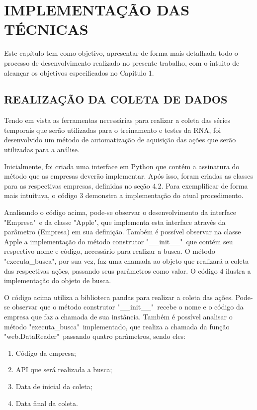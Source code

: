 
\chapter{IMPLEMENTAÇÃO DAS TÉCNICAS}\label{ch:implementacao}
Este capítulo tem como objetivo, apresentar de forma mais detalhada todo o processo de desenvolvimento realizado no presente trabalho, com o intuito de alcançar os objetivos especificados no Capítulo 1.

\section{REALIZAÇÃO DA COLETA DE DADOS}
Tendo em vista as ferramentas necessárias para realizar a coleta das séries temporais que serão utilizadas para o treinamento e testes da RNA, foi desenvolvido um método de automatização de aquisição das ações que serão utilizadas para a análise.

Inicialmente, foi criada uma interface em Python que contém a assinatura do método que as empresas deverão implementar. Após isso, foram criadas as classes para as respectivas empresas, definidas no seção 4.2. Para exemplificar de forma mais intuituva, o código 3 demonstra a implementação do atual procedimento. 
\codigoPython\


Analisando o código acima, pode-se observar o desenvolvimento da interface "Empresa"\, e da classe "Apple", que implementa esta interface através da parâmetro (Empresa) em sua definição. Também é possível observar na classe Apple a implementação do método construtor "\_\_init\_\_"\, que contém seu respectivo nome e código, necessário para realizar a busca. O método "executa\_busca", por sua vez, faz uma chamada ao objeto que realizará a coleta das respectivas ações, passando seus parâmetros como valor. O código 4 ilustra a implementação do objeto de busca.
\codigoPython\


O código acima utiliza a biblioteca pandas para realizar a coleta das ações. Pode-se observar que o método construtor "\_\_init\_\_"\, recebe o nome e o código da empresa que faz a chamada de sua instância. Também é possível analisar o método "executa\_busca"\, implementado, que realiza a chamada da função "web.DataReader"\,
passando quatro parâmetros, sendo eles:
\begin{enumerate}
\item Código da empresa;
\item API que será realizada a busca;
\item Data de inicial da coleta;
\item Data final da coleta.
\end{enumerate}

